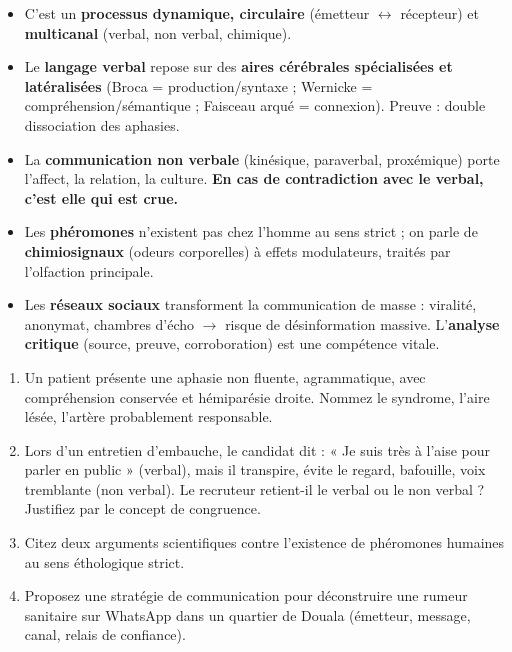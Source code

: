 \documentclass[11pt]{article}
\begin{document}
\begin{aretenir}
\begin{itemize}
\item C'est un \textbf{processus dynamique, circulaire} (émetteur $\leftrightarrow$ récepteur) et \textbf{multicanal} (verbal, non verbal, chimique).
\item Le \textbf{langage verbal} repose sur des \textbf{aires cérébrales spécialisées et latéralisées} (Broca = production/syntaxe ; Wernicke = compréhension/sémantique ; Faisceau arqué = connexion). Preuve : double dissociation des aphasies.
\item La \textbf{communication non verbale} (kinésique, paraverbal, proxémique) porte l'affect, la relation, la culture. \textbf{En cas de contradiction avec le verbal, c'est elle qui est crue.}
\item Les \textbf{phéromones} n'existent pas chez l'homme au sens strict ; on parle de \textbf{chimiosignaux} (odeurs corporelles) à effets modulateurs, traités par l'olfaction principale.
\item Les \textbf{réseaux sociaux} transforment la communication de masse : viralité, anonymat, chambres d'écho $\to$ risque de désinformation massive. L'\textbf{analyse critique} (source, preuve, corroboration) est une compétence vitale.
\end{itemize}
\end{aretenir}

\begin{exercice}
\begin{enumerate}
\item Un patient présente une aphasie non fluente, agrammatique, avec compréhension conservée et hémiparésie droite. Nommez le syndrome, l'aire lésée, l'artère probablement responsable.
\item Lors d'un entretien d'embauche, le candidat dit : « Je suis très à l'aise pour parler en public » (verbal), mais il transpire, évite le regard, bafouille, voix tremblante (non verbal). Le recruteur retient-il le verbal ou le non verbal ? Justifiez par le concept de congruence.
\item Citez deux arguments scientifiques contre l'existence de phéromones humaines au sens éthologique strict.
\item Proposez une stratégie de communication pour déconstruire une rumeur sanitaire sur WhatsApp dans un quartier de Douala (émetteur, message, canal, relais de confiance).
\end{enumerate}
\end{exercice}
\end{document}
